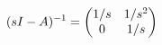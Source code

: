 \documentclass[preview]{standalone}
\begin{document}
\begin{align*}
\special{dvisvgm:raw <g id='unique000'>}(sI-A)^{-1}=\begin{pmatrix}1/s&1/s^2\\0&1/s\end{pmatrix}\special{dvisvgm:raw </g>}
\end{align*}
\end{document}
